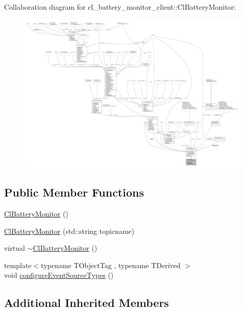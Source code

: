 Collaboration diagram for cl\+\_\+battery\+\_\+monitor\+\_\+client\+:\+:Cl\+Battery\+Monitor\+:
\nopagebreak
\begin{figure}[H]
\begin{center}
\leavevmode
\includegraphics[width=350pt]{classcl__battery__monitor__client_1_1ClBatteryMonitor__coll__graph}
\end{center}
\end{figure}
\subsection*{Public Member Functions}
\begin{DoxyCompactItemize}
\item 
\hyperlink{classcl__battery__monitor__client_1_1ClBatteryMonitor_a6a399bdad03fb99ed98685e25f1a2f25}{Cl\+Battery\+Monitor} ()
\item 
\hyperlink{classcl__battery__monitor__client_1_1ClBatteryMonitor_ae3705838008a79d4bcd5e8806fbd783d}{Cl\+Battery\+Monitor} (std\+::string topicname)
\item 
virtual \hyperlink{classcl__battery__monitor__client_1_1ClBatteryMonitor_a583e52bdd7d15f688c265524cf87b68b}{$\sim$\+Cl\+Battery\+Monitor} ()
\item 
{\footnotesize template$<$typename T\+Object\+Tag , typename T\+Derived $>$ }\\void \hyperlink{classcl__battery__monitor__client_1_1ClBatteryMonitor_a284b4d9f27ad2702d22c01d8eb2df8f0}{configure\+Event\+Source\+Types} ()
\end{DoxyCompactItemize}
\subsection*{Additional Inherited Members}


